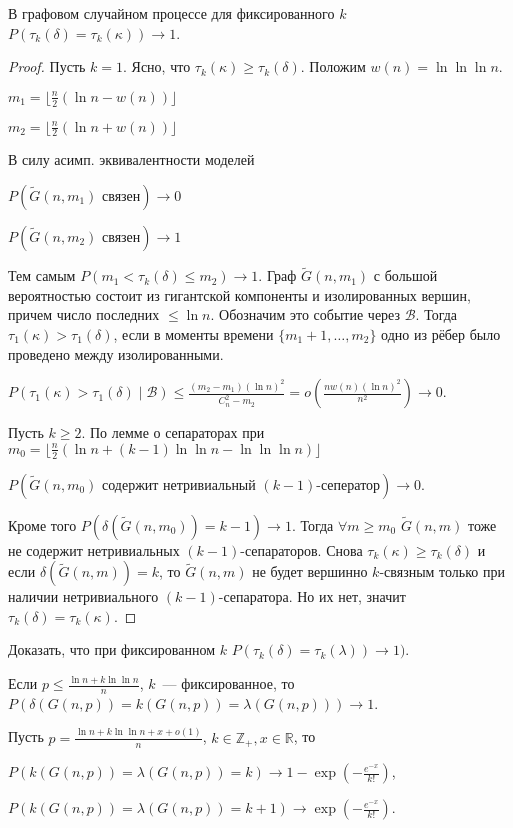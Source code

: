 \documentclass{article}
\begin{document}
\begin{theorem}
	В графовом случайном процессе для фиксированного $k$ $P(\tau_k(\delta) = \tau_k(\kappa))
	\rightarrow 1$.
\end{theorem}
\begin{proof}
	Пусть $k = 1$. Ясно, что $\tau_k(\kappa) \ge \tau_k(\delta)$. Положим $w(n) = \ln \ln \ln n$.

	$m_1 = \lfloor \frac{n}{2} (\ln n - w(n)) \rfloor$

	$m_2 = \lfloor \frac{n}{2} (\ln n + w(n)) \rfloor$

	В силу асимп. эквивалентности моделей
	
	$P(\tilde{G}(n,m_1) \text{ связен}) \rightarrow 0$

	$P(\tilde{G}(n,m_2) \text{ связен}) \rightarrow 1$

	Тем самым $P(m_1 < \tau_k(\delta) \le m_2) \rightarrow 1$. Граф $\tilde{G}(n,m_1)$ с большой
	вероятностью состоит из гигантской компоненты и изолированных вершин, причем число последних $\le
	\ln n$. Обозначим это событие через $\mathcal{B}$. Тогда $\tau_1(\kappa) > \tau_1(\delta)$, если
	в моменты времени $\{m_1 + 1, \ldots, m_2\}$ одно из рёбер было проведено между изолированными.

	$ P(\tau_1(\kappa) > \tau_1(\delta) \mid \mathcal{B}) \le \frac{(m_2 - m_1) (\ln n)^2}{C_n^2 -
	m_2} = o\left(\frac{nw(n) (\ln n)^2}{n^2}\right) \rightarrow 0$.

	Пусть $k \ge 2$. По лемме о сепараторах при $m_0 = \lfloor \frac{n}{2}(\ln n + (k-1)\ln\ln n - \ln
	\ln \ln n)\rfloor$

	$P(\tilde{G}(n,m_0) \text{ содержит нетривиальный $(k-1)$-сеператор}) \rightarrow 0$.

	Кроме того $P(\delta(\tilde{G}(n,m_0))=k-1) \rightarrow 1$. Тогда $\forall m \ge m_0$
	$\tilde{G}(n,m)$ тоже не содержит нетривиальных $(k-1)$-сепараторов. Снова $\tau_k(\kappa) \ge
	\tau_k(\delta)$ и если $\delta(\tilde{G}(n,m)) = k$, то $\tilde{G}(n, m)$ не будет вершинно
	$k$-связным только при наличии нетривиального $(k-1)$-сепаратора. Но их нет, значит
	$\tau_k(\delta) = \tau_k(\kappa)$.
\end{proof}

\begin{exercise}
	Доказать, что при фиксированном $k$ $P(\tau_k(\delta) = \tau_k(\lambda)) \rightarrow 1)$.
\end{exercise}

\begin{corollary}
	Если $p \le \frac{\ln n + k \ln \ln n}{n}$, $k$~--- фиксированное, то
	$P(\delta(G(n,p))=k(G(n,p))=\lambda(G(n,p))) \rightarrow 1$.
\end{corollary}
\begin{corollary}
	Пусть $p = \frac{\ln n + k \ln \ln n + x + o(1)}{n}$, $k \in \mathbb{Z}_{+}, x \in \mathbb{R}$, то

	$P(k(G(n,p))=\lambda(G(n,p))=k) \rightarrow 1 - \exp\left(-\frac{e^{-x}}{k!}\right)$,

	$P(k(G(n,p))=\lambda(G(n,p))=k+1) \rightarrow \exp\left(-\frac{e^{-x}}{k!}\right)$.
\end{corollary}
\end{document}
